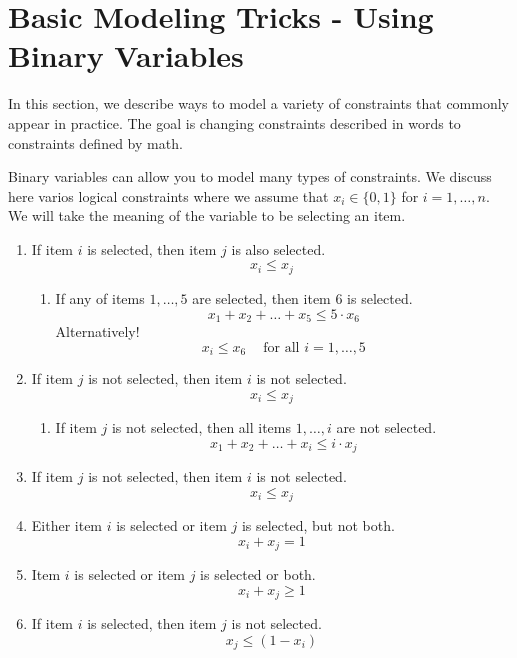 \section{Basic Modeling Tricks - Using Binary Variables}
In this section, we describe ways to model a variety of constraints that commonly appear in practice.  The goal is changing constraints described in words to constraints defined by math.

Binary variables can allow you to model many types of constraints.  We discuss here varios logical constraints where we assume that $x_i \in \{0,1\}$ for $i=1, \dots, n$.  We will take the meaning of the variable to be selecting an item.

\begin{enumerate}
 \item If item $i$ is selected, then item $j$ is also selected.
 \begin{equation}
 x_i \leq x_j
 \end{equation}
 \begin{enumerate}
 \item If any of items $1, \dots, 5$ are selected, then item $6$ is selected.
 \begin{equation}
 x_1 + x_2 + \dots + x_5 \leq 5 \cdot x_6
 \end{equation}
 Alternatively!
 \begin{equation}
 x_i \leq x_6 \ \ \ \ \text{ for all } i=1, \dots, 5
 \end{equation}
 \end{enumerate}
 \item If item $j$ is not selected, then item $i$ is not selected.
 \begin{equation}
x_i \leq x_j
 \end{equation}
  \begin{enumerate}
 \item If item $j$ is not selected, then all items $1, \dots, i$ are not selected.
 \begin{equation}
 x_1 + x_2 + \dots + x_i \leq i \cdot x_j
 \end{equation}
 \end{enumerate}
  \item If item $j$ is not selected, then item $i$ is not selected.
 \begin{equation}
x_i \leq x_j
 \end{equation}
\item Either item $i$ is selected or item $j$ is selected, but not both.
 \begin{equation}
 x_i + x_j = 1
 \end{equation}
\item Item $i$ is selected or item $j$ is selected or both.
 \begin{equation}
 x_i + x_j \geq 1
 \end{equation}
\item If item $i$ is selected, then item $j$ is not selected.
 \begin{equation}
x_j \leq (1-x_i)
 \end{equation}


\end{enumerate}
